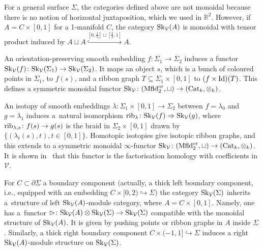 \begin{Remark}\label{Skmonoidal}
For a general surface $\Sigma$, the categories defined above are not monoidal because there is no notion of horizontal juxtaposition, which we used in $\mathbb{R}^2$. However, if $A = C \times [0,1]$ for a 1-manifold $C$, the category ${\rm Sk}_\mathcal{V}(A)$ is monoidal with tensor product induced by $A \sqcup A \overset{[0,\frac{1}{3}]\sqcup[\frac{2}{3},1]}\hookrightarrow A$.
\end{Remark}

\begin{Remark}\label{rmkFunctEmbIsotOfSkCat} An orientation-preserving smooth embedding $f\colon\Sigma_1 \allowbreak\to \Sigma_2$ induces a functor ${\rm Sk}_\mathcal{V}(f)\colon{\rm Sk}_\mathcal{V}(\Sigma_1)\to {\rm Sk}_\mathcal{V}(\Sigma_2)$. It maps an object $s$, which is a bunch of coloured points in $\Sigma_1$, to $f(s)$, and a ribbon graph $T \subseteq \Sigma_1 \times [0,1]$ to $(f\times {\rm Id})(T)$. This defines a symmetric monoidal functor ${\rm Sk}_\mathcal{V}\colon ({\rm Mfld}_2^{\rm or},\sqcup) \to ({\rm Cat}_k,\otimes_k)$.

An isotopy of smooth embeddings $\lambda \colon \Sigma_1 \times [0,1] \to \Sigma_2$ between $f=\lambda_0$ and $g=\lambda_1$ induces a~natural isomorphism ${\rm rib}_\lambda\colon {\rm Sk}_\mathcal{V}(f) \Rightarrow {\rm Sk}_\mathcal{V}(g)$, where ${\rm rib}_{\lambda,s}\colon f(s) \to g(s)$ is the braid in $\Sigma_2 \times [0,1]$ drawn by $\{(\lambda_t(s),t), t \in [0,1]\}$. Homotopic isotopies give isotopic ribbon graphs, and this extends to a symmetric monoidal $\infty$-functor ${\rm Sk}_\mathcal{V}\colon ({\rm Mfld}_2^{\rm or},\sqcup) \to ({\rm Cat}_k,\otimes_k)$. It is shown in~\cite{Cooke} that this functor is the factorisation homology with coefficients in $\mathcal{V}$.
\end{Remark}

\begin{Proposition}\label{Skmodcat}
For $C\subset \partial \Sigma$ a boundary component $($actually, a thick left boundary component, i.e., equipped with an embedding $C \times [0,2) \hookrightarrow \Sigma)$ the category ${\rm Sk}_\mathcal{V}(\Sigma)$ inherits a~structure of left ${\rm Sk}_\mathcal{V}(A)$-module category, where $A = C\times [0,1]$. Namely, one has a~functor $\rhd\colon {\rm Sk}_\mathcal{V}(A) \otimes {\rm Sk}_\mathcal{V}(\Sigma) \to {\rm Sk}_\mathcal{V}(\Sigma)$ compatible with the monoidal structure of ${\rm Sk}_\mathcal{V}(A)$. It is given by pushing points or ribbon graphs in $A$ inside $\Sigma$.
Similarly, a thick right boundary component $C\times (-1,1]\hookrightarrow \Sigma$ induces a right ${\rm Sk}_\mathcal{V}(A)$-module structure on ${\rm Sk}_\mathcal{V}(\Sigma)$.
\end{Proposition}
